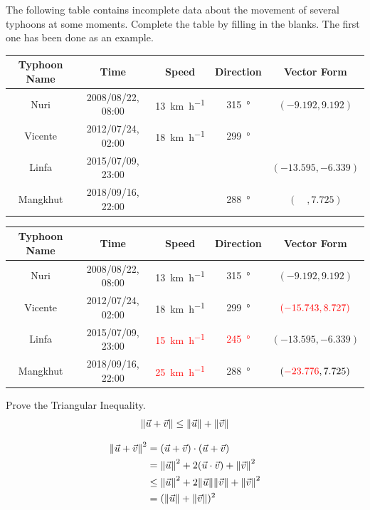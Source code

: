 \begin{Exercise}
The following table contains incomplete data about the movement of several typhoons at some moments. Complete the table by filling in the blanks. The first one has been done as an example.
\begin{center}
\footnotesize
\begin{tabular}{|c|c|c|c|c|}
\hline
Typhoon Name & Time & Speed & Direction & Vector Form\\
\hline
Nuri & 2008/08/22, 08:00 & \SI{13}{\km \per \hour} & \SI{315}{\degree} & $(-9.192, 9.192)$\\
\hline
Vicente & 2012/07/24, 02:00 & \SI{18}{\km \per \hour} & \SI{299}{\degree} & \\
\hline
Linfa & 2015/07/09, 23:00 & & & $(-13.595, -6.339)$\\
\hline
Mangkhut & 2018/09/16, 22:00 & & \SI{288}{\degree} & $(\quad, 7.725)$\\
\hline
\end{tabular}
\end{center}
\end{Exercise}
\begin{Answer}
\begin{center}
\footnotesize
\begin{tabular}{|c|c|c|c|c|}
\hline
Typhoon Name & Time & Speed & Direction & Vector Form\\
\hline
Nuri & 2008/08/22, 08:00 & \SI{13}{\km \per \hour} & \SI{315}{\degree} & $(-9.192, 9.192)$\\
\hline
Vicente & 2012/07/24, 02:00 & \SI{18}{\km \per \hour} & \SI{299}{\degree} & $\textcolor{red}{(-15.743, 8.727)}$\\
\hline
Linfa & 2015/07/09, 23:00 & \textcolor{red}{\SI{15}{\km \per \hour}} & \textcolor{red}{\SI{245}{\degree}} & $(-13.595, -6.339)$\\
\hline
Mangkhut & 2018/09/16, 22:00 & \textcolor{red}{\SI{25}{\km \per \hour}} & \SI{288}{\degree} & $(\textcolor{red}{-23.776}, 7.725)$\\
\hline
\end{tabular}
\end{center}    
\end{Answer}

\begin{Exercise}
Prove the Triangular Inequality.
\begin{align*}
\norm{\vec{u} + \vec{v}} \leq \norm{\vec{u}} + \norm{\vec{v}}
\end{align*}
\end{Exercise}
\begin{Answer}
\begin{align*}
\norm{\vec{u} + \vec{v}}^2 &= (\vec{u} + \vec{v}) \cdot (\vec{u} + \vec{v}) \\
&= \norm{\vec{u}}^2 + 2(\vec{u}\cdot\vec{v}) + \norm{\vec{v}}^2 \\
&\leq \norm{\vec{u}}^2 + 2\norm{\vec{u}}\norm{\vec{v}} + \norm{\vec{v}}^2 \\
&= (\norm{\vec{u}} + \norm{\vec{v}})^2
\end{align*}
\end{Answer}

